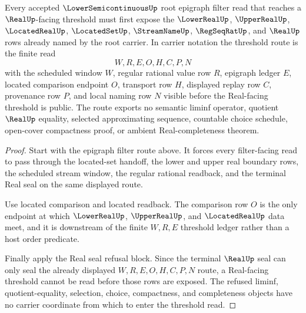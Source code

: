 \begin{theorem}
\label{thm:lowersemicontinuous-root-filter-real-threshold}
Every accepted $\LowerSemicontinuousUp$ root epigraph filter read that reaches a $\RealUp$-facing threshold must first expose the $\LowerRealUp$, $\UpperRealUp$, $\LocatedRealUp$, $\LocatedSetUp$, $\StreamNameUp$, $\RegSeqRatUp$, and $\RealUp$ rows already named by the root carrier. In carrier notation the threshold route is the finite read
$$
W,R,E,O,H,C,P,N
$$
with the scheduled window $W$, regular rational value row $R$, epigraph ledger $E$, located comparison endpoint $O$, transport row $H$, displayed replay row $C$, provenance row $P$, and local naming row $N$ visible before the Real-facing threshold is public. The route exports no semantic liminf operator, quotient $\RealUp$ equality, selected approximating sequence, countable choice schedule, open-cover compactness proof, or ambient Real-completeness theorem.
\end{theorem}
\begin{proof}
Start with the epigraph filter route above. It forces every filter-facing read to pass through the located-set handoff, the lower and upper real boundary rows, the scheduled stream window, the regular rational readback, and the terminal Real seal on the same displayed route.

Use located comparison and located readback. The comparison row $O$ is the only endpoint at which $\LowerRealUp$, $\UpperRealUp$, and $\LocatedRealUp$ data meet, and it is downstream of the finite $W,R,E$ threshold ledger rather than a host order predicate.

Finally apply the Real seal refusal block. Since the terminal $\RealUp$ seal can only seal the already displayed $W,R,E,O,H,C,P,N$ route, a Real-facing threshold cannot be read before those rows are exposed. The refused liminf, quotient-equality, selection, choice, compactness, and completeness objects have no carrier coordinate from which to enter the threshold read.
\end{proof}

